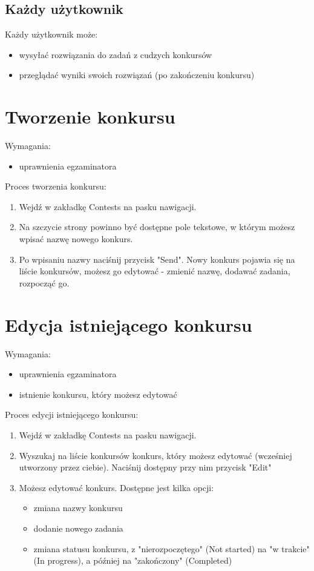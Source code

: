 \documentclass{article}
\begin{document}
\subsection{Każdy użytkownik}
Każdy użytkownik może:
\begin{itemize}
    \item wysyłać rozwiązania do zadań z cudzych konkursów
    \item przeglądać wyniki swoich rozwiązań (po zakończeniu konkursu)
\end{itemize}

\section{Tworzenie konkursu}
Wymagania:
\begin{itemize}
	\item uprawnienia egzaminatora
\end{itemize}
Proces tworzenia konkursu:
\begin{enumerate}
	\item Wejdź w zakładkę Contests na pasku nawigacji.
	\item Na szczycie strony powinno być dostępne pole tekstowe, w którym możesz wpisać nazwę nowego konkurs.
	\item Po wpisaniu nazwy naciśnij przycisk "Send". Nowy konkurs pojawia się na liście konkursów, możesz go edytować - zmienić nazwę, dodawać zadania, rozpocząć go.
\end{enumerate}

\section{Edycja istniejącego konkursu}
Wymagania:
\begin{itemize}
	\item uprawnienia egzaminatora
	\item istnienie konkursu, który możesz edytować
\end{itemize}
Proces edycji istniejącego konkursu:
\begin{enumerate}
	\item Wejdź w zakładkę Contests na pasku nawigacji.
	\item Wyszukaj na liście konkursów konkurs, który możesz edytować (wcześniej utworzony przez ciebie). Naciśnij dostępny przy nim przycisk "Edit"
	\item Możesz edytować konkurs. Dostępne jest kilka opcji:
	\begin{itemize}
		\item zmiana nazwy konkursu
		\item dodanie nowego zadania
		\item zmiana statusu konkursu, z "nierozpoczętego" (Not started) na "w trakcie" (In progress), a później na "zakończony" (Completed)
	\end{itemize}
\end{enumerate}
\end{document}
